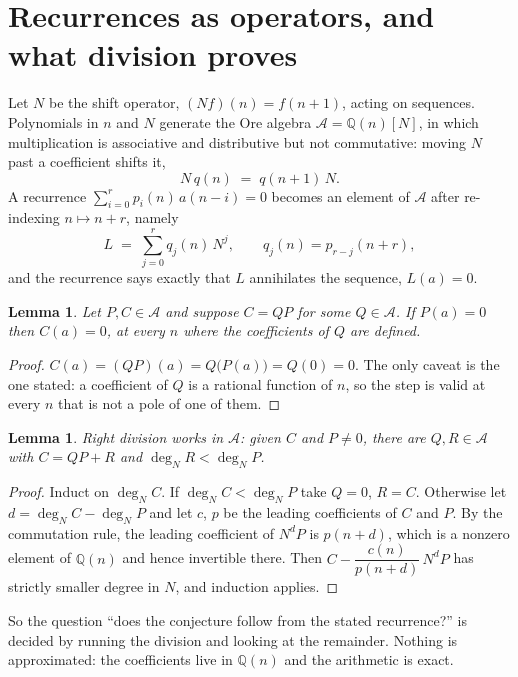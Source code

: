 \documentclass[11pt,a4paper]{article}
\theoremstyle{plain}
\newtheorem{lemma}[theorem]{Lemma}
\theoremstyle{definition}
\begin{document}
\section{Recurrences as operators, and what division proves}

Let $N$ be the shift operator, $(Nf)(n)=f(n+1)$, acting on sequences. Polynomials in $n$
and $N$ generate the Ore algebra $\mathcal{A}=\mathbb{Q}(n)[N]$, in which multiplication is
associative and distributive but not commutative: moving $N$ past a coefficient shifts it,
\[
N\,q(n)\;=\;q(n+1)\,N .
\]
A recurrence $\sum_{i=0}^{r}p_{i}(n)\,a(n-i)=0$ becomes an element of $\mathcal{A}$ after
re-indexing $n\mapsto n+r$, namely
\[
L\;=\;\sum_{j=0}^{r}q_{j}(n)\,N^{j},\qquad q_{j}(n)=p_{r-j}(n+r),
\]
and the recurrence says exactly that $L$ annihilates the sequence, $L(a)=0$.

\begin{lemma}\label{lem:factor}
Let $P,C\in\mathcal{A}$ and suppose $C=QP$ for some $Q\in\mathcal{A}$. If $P(a)=0$ then
$C(a)=0$, at every $n$ where the coefficients of $Q$ are defined.
\end{lemma}

\begin{proof}
$C(a)=(QP)(a)=Q\bigl(P(a)\bigr)=Q(0)=0$. The only caveat is the one stated: a coefficient
of $Q$ is a rational function of $n$, so the step is valid at every $n$ that is not a pole
of one of them.
\end{proof}

\begin{lemma}\label{lem:div}
Right division works in $\mathcal{A}$: given $C$ and $P\neq0$, there are $Q,R\in\mathcal{A}$
with $C=QP+R$ and $\deg_{N}R<\deg_{N}P$.
\end{lemma}

\begin{proof}
Induct on $\deg_{N}C$. If $\deg_{N}C<\deg_{N}P$ take $Q=0$, $R=C$. Otherwise let
$d=\deg_{N}C-\deg_{N}P$ and let $c$, $p$ be the leading coefficients of $C$ and $P$. By the
commutation rule, the leading coefficient of $N^{d}P$ is $p(n+d)$, which is a nonzero
element of $\mathbb{Q}(n)$ and hence invertible there. Then
$C-\dfrac{c(n)}{p(n+d)}\,N^{d}P$ has strictly smaller degree in $N$, and induction applies.
\end{proof}

So the question ``does the conjecture follow from the stated recurrence?'' is decided by
running the division and looking at the remainder. Nothing is approximated: the
coefficients live in $\mathbb{Q}(n)$ and the arithmetic is exact.
\end{document}
